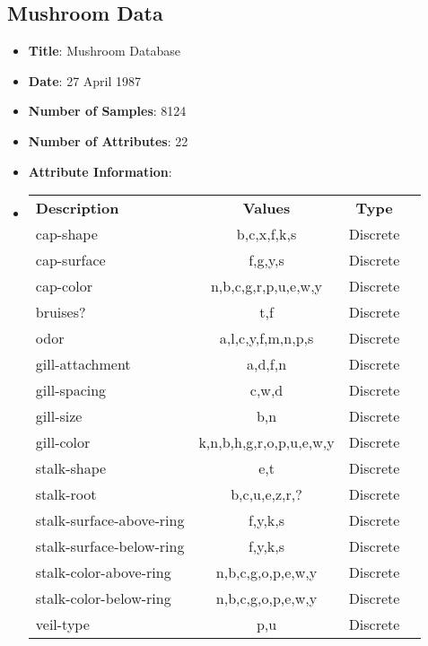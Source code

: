 \documentclass[11pt]{article}
\newcommand{\bb}{\textbf}
\begin{document}
\subsection{Mushroom Data}
\begin{itemize}[leftmargin=*]
  \item[] \bb{Title}: Mushroom Database
  \item[] \bb{Date}: 27 April 1987
  \item[] \bb{Number of Samples}: 8124
  \item[] \bb{Number of Attributes}: 22
  \item[] \bb{Attribute Information}:
  \item[]
  \begin{tabular}{l c c c }
    \bb{Description}         & \bb{Values}             & \bb{Type} \\
    cap-shape                & b,c,x,f,k,s             & Discrete  \\
    cap-surface              & f,g,y,s                 & Discrete  \\
    cap-color                & n,b,c,g,r,p,u,e,w,y     & Discrete  \\
    bruises?                 & t,f                     & Discrete  \\
    odor                     & a,l,c,y,f,m,n,p,s       & Discrete  \\
    gill-attachment          & a,d,f,n                 & Discrete  \\
    gill-spacing             & c,w,d                   & Discrete  \\
    gill-size                & b,n                     & Discrete  \\
    gill-color               & k,n,b,h,g,r,o,p,u,e,w,y & Discrete  \\
    stalk-shape              & e,t                     & Discrete  \\
    stalk-root               & b,c,u,e,z,r,?           & Discrete  \\
    stalk-surface-above-ring & f,y,k,s                 & Discrete  \\
    stalk-surface-below-ring & f,y,k,s                 & Discrete  \\
    stalk-color-above-ring   & n,b,c,g,o,p,e,w,y       & Discrete  \\
    stalk-color-below-ring   & n,b,c,g,o,p,e,w,y       & Discrete  \\
    veil-type                & p,u                     & Discrete  \\

\end{tabular}
\end{itemize}
\end{document}

